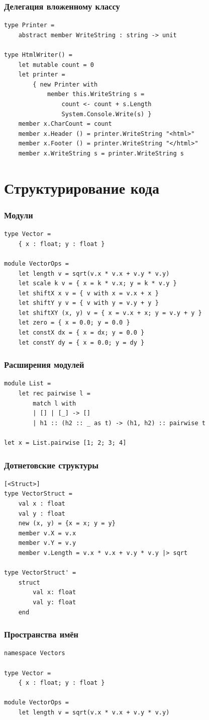 \documentclass{../../slides-style}
\begin{document}
    \begin{frame}[fragile]
        \frametitle{Делегация вложенному классу}
        \begin{verbatim}
type Printer =
    abstract member WriteString : string -> unit

type HtmlWriter() =
    let mutable count = 0
    let printer =
        { new Printer with
            member this.WriteString s =
                count <- count + s.Length
                System.Console.Write(s) }
    member x.CharCount = count
    member x.Header () = printer.WriteString "<html>"
    member x.Footer () = printer.WriteString "</html>"
    member x.WriteString s = printer.WriteString s
        \end{verbatim}
    \end{frame}

    \section{Структурирование кода}

    \begin{frame}[fragile]
        \frametitle{Модули}
        \begin{verbatim}
type Vector =
    { x : float; y : float }

module VectorOps =
    let length v = sqrt(v.x * v.x + v.y * v.y)
    let scale k v = { x = k * v.x; y = k * v.y }
    let shiftX x v = { v with x = v.x + x }
    let shiftY y v = { v with y = v.y + y }
    let shiftXY (x, y) v = { x = v.x + x; y = v.y + y }
    let zero = { x = 0.0; y = 0.0 }
    let constX dx = { x = dx; y = 0.0 }
    let constY dy = { x = 0.0; y = dy }
        \end{verbatim}
    \end{frame}

    \begin{frame}[fragile]
        \frametitle{Расширения модулей}
        \begin{verbatim}
module List =
    let rec pairwise l =
        match l with
        | [] | [_] -> []
        | h1 :: (h2 :: _ as t) -> (h1, h2) :: pairwise t

let x = List.pairwise [1; 2; 3; 4]
        \end{verbatim}
    \end{frame}

    \begin{frame}[fragile]
        \frametitle{Дотнетовские структуры}
        \begin{verbatim}
[<Struct>]
type VectorStruct =
    val x : float
    val y : float
    new (x, y) = {x = x; y = y}
    member v.X = v.x
    member v.Y = v.y
    member v.Length = v.x * v.x + v.y * v.y |> sqrt

type VectorStruct' =
    struct
        val x: float
        val y: float
    end
        \end{verbatim}
    \end{frame}

    \begin{frame}[fragile]
        \frametitle{Пространства имён}
        \begin{verbatim}
namespace Vectors

type Vector =
    { x : float; y : float }

module VectorOps =
    let length v = sqrt(v.x * v.x + v.y * v.y)
        \end{verbatim}
    \end{frame}
\end{document}
